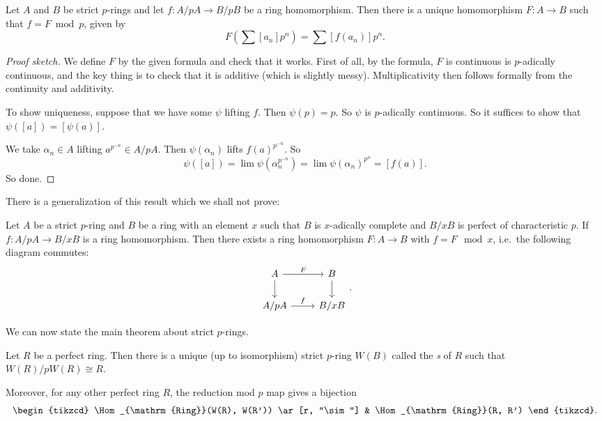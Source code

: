 \documentclass[a4paper]{article}
\begin{document}
\begin{lemma}
  Let $A$ and $B$ be strict $p$-rings and let $f: A/pA \to B/pB$ be a ring homomorphism. Then there is a unique homomorphism $F: A \to B$ such that $f = F \bmod p$, given by
  \[
    F\left(\sum [a_n]p^n\right) = \sum [f(a_n)] p^n.
  \]
\end{lemma}

\begin{proof}[Proof sketch]
  We define $F$ by the given formula and check that it works. First of all, by the formula, $F$ is continuous is $p$-adically continuous, and the key thing is to check that it is additive (which is slightly messy). Multiplicativity then follows formally from the continuity and additivity.

  To show uniqueness, suppose that we have some $\psi$ lifting $f$. Then $\psi(p) = p$. So $\psi$ is $p$-adically continuous. So it suffices to show that $\psi([a]) = [\psi(a)]$.

  We take $\alpha_n \in A$ lifting $a^{p^{-n}} \in A/pA$. Then $\psi(\alpha_n)$ lifts $f(a)^{p^{-n}}$. So
  \[
    \psi([a]) = \lim \psi(\alpha_n^{p^{-n}}) = \lim \psi(\alpha_n)^{p^n} = [f(a)].
  \]
  So done.
\end{proof}

There is a generalization of this result which we shall not prove:
\begin{prop}
  Let $A$ be a strict $p$-ring and $B$ be a ring with an element $x$ such that $B$ is $x$-adically complete and $B/xB$ is perfect of characteristic $p$. If $f: A/pA \to B/xB$ is a ring homomorphism. Then there exists a ring homomorphism $F: A \to B$ with $f = F \mod x$, i.e.\ the following diagram commutes:
  \[
    \begin{tikzcd}
      A \ar[r, "F"] \ar[d] & B \ar[d]\\
      A/pA \ar[r, "f"] & B/xB
    \end{tikzcd}.
  \]
\end{prop}

We can now state the main theorem about strict $p$-rings.

\begin{thm}
  Let $R$ be a perfect ring. Then there is a unique (up to isomorphism) strict $p$-ring $W(B)$ called the \emph{s} of $R$ such that $W(R)/p W(R) \cong R$.

  Moreover, for any other perfect ring $R$, the reduction mod $p$ map gives a bijection
  \[
    \begin{tikzcd}
      \Hom_{\mathrm{Ring}}(W(R), W(R')) \ar[r, "\sim"] & \Hom_{\mathrm{Ring}}(R, R')
    \end{tikzcd}.
  \]
\end{thm}
\end{document}
